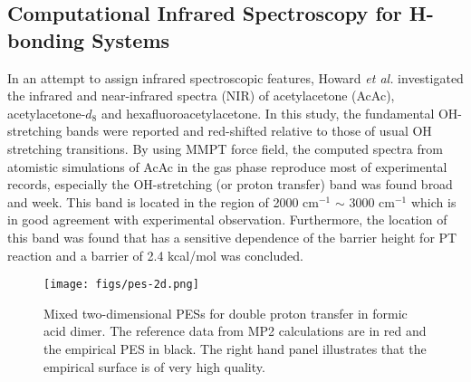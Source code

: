 \documentclass[journal=jacsat,manuscript=article]{achemso}
\begin{document}
\subsection{Computational Infrared Spectroscopy for H-bonding Systems}

\noindent
In an attempt to assign infrared spectroscopic features, Howard
\emph{et al.}  investigated the infrared and near-infrared spectra
(NIR) of acetylacetone (AcAc), acetylacetone-$ d_8 $ and
hexafluoroacetylacetone\cite{howardmeuwly.jpca.2015.mmpt}.  In this
study, the fundamental OH-stretching bands were reported and
red-shifted relative to those of usual OH stretching transitions. By
using MMPT force field, the computed spectra from atomistic
simulations of AcAc in the gas phase reproduce most of experimental
records, especially the OH-stretching (or proton transfer) band was
found broad and week. This band is located in the region of 2000 cm$
^{-1} $ $ \sim $ 3000 cm$^{-1}$ which is in good agreement with
experimental observation. Furthermore, the location of this band was
found that has a sensitive dependence of the barrier height for PT
reaction and a barrier of 2.4 kcal/mol was concluded.  \\


\begin{figure}
\texttt{[image: figs/pes-2d.png]}
\caption{Mixed two-dimensional PESs for double proton transfer in
  formic acid dimer. The reference data from MP2 calculations are in
  red and the empirical PES in black. The right hand panel illustrates
  that the empirical surface is of very high quality.}
\label{fig:pes-dpt}
\end{figure}
\end{document}
